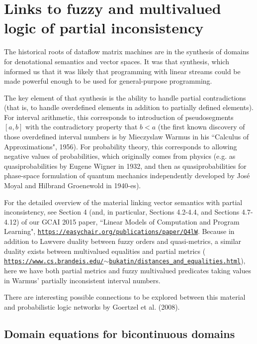 \documentclass{article}
\begin{document}
\section{Links to fuzzy and multivalued logic of
partial inconsistency}

The historical roots of dataflow matrix machines are in the synthesis of domains
for denotational semantics and vector spaces. It was that synthesis, which informed us that it was likely
that programming with linear streams could be made powerful enough to be used for general-purpose programming.

The key element of that synthesis is the ability to handle partial contradictions (that is, to handle
overdefined elements in addition to partially defined elements). For interval arithmetic,  
this corresponds to introduction of pseudosegments $[a, b]$ with the contradictory property that
$b < a$ (the first known discovery of those overdefined interval numbers is by Mieczyslaw Warmus in his ``Calculus of Approximations", 1956). For probability theory, this corresponds to allowing negative values of probabilities,
which originally comes from physics (e.g. as quasiprobabilities by Eugene Wigner in 1932, and then as quasiprobabilities for phase-space formulation
of quantum mechanics independently developed by Jos\'e Moyal and Hilbrand Groenewold in 1940-es).

For the detailed overview of the material linking vector semantics with partial inconsistency, see Section 4 (and, in particular, Sections 4.2-4.4, and Sections 4.7-4.12) of our GCAI 2015 paper, ``Linear Models of Computation and Program Learning", \href{https://easychair.org/publications/paper/Q4lW}{\tt https://easychair.org/publications/paper/Q4lW}. Because in addition to Lawvere duality between fuzzy orders and quasi-metrics, a similar duality exists between multivalued equalities and partial metrics ( \href{https://www.cs.brandeis.edu/~bukatin/distances_and_equalities.html}{\tt https://www.cs.brandeis.edu/$\sim$bukatin/distances\_and\_equalities.html}), here we have both partial metrics and fuzzy multivalued predicates taking values in Warmus' partially inconsistent interval numbers.

There are interesting possible connections to be explored between this material and probabilistic logic networks by Goertzel et al. (2008).

\subsection{Domain equations for bicontinuous domains}
\end{document}
